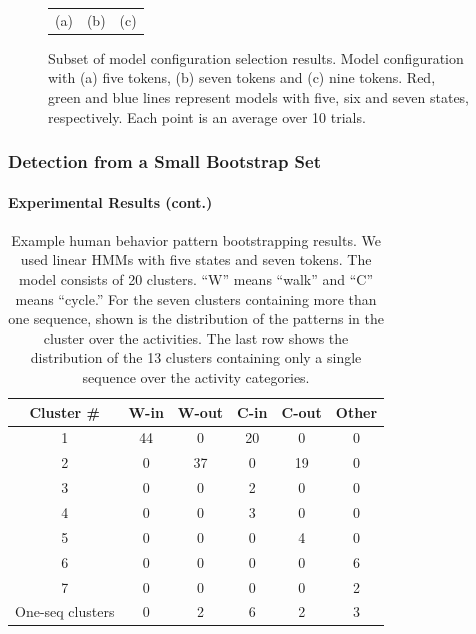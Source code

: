 \begin{frame}
\begin{figure}
\begin{tabular}{ccc}
            (a) & (b) & (c)
        \end{tabular}
        \caption{Subset of model configuration selection results.  Model
            configuration with (a) five tokens, (b) seven tokens and (c) nine
            tokens. Red, green and blue lines represent models with five, six
            and seven states, respectively.  Each point is an average over 10
            trials.}
        \label{fig:batch-some-clustering-results}
    \end{figure}

\end{frame}


\begin{frame}
    \frametitle{Detection from a Small Bootstrap Set}
    \framesubtitle{Experimental Results (cont.)}

    \vspace{-0.1in}
    \begin{table}
        \caption{Example human behavior pattern bootstrapping
        results. We used linear HMMs with five states and seven
        tokens. The model consists of 20 clusters. ``W'' means ``walk''
        and ``C'' means ``cycle.''  For the seven clusters containing more
        than one sequence, shown is the distribution of the patterns in
        the cluster over the activities.  The last row shows the
        distribution of the 13 clusters containing only a single sequence
        over the activity categories.}
        \centering
        \begin{tabular}{c|c|c|c|c|c}
            \hline
            Cluster \# & W-in & W-out & C-in & C-out & Other \\
            \hline \hline
            1 & 44 & 0 & 20 & 0 & 0 \\ \hline
            2 & 0 & 37 & 0 & 19 & 0 \\ \hline
            3 & 0 & 0 & 2 & 0 & 0 \\ \hline
            4 & 0 & 0 & 3 & 0 & 0 \\ \hline
            5 & 0 & 0 & 0 & 4 & 0 \\ \hline
            6 & 0 & 0 & 0 & 0 & 6 \\ \hline
            7 & 0 & 0 & 0 & 0 & 2 \\ \hline
            One-seq clusters & 0 & 2 & 6 & 2 & 3 \\ \hline
        \end{tabular}
    \end{table}

\end{frame}

